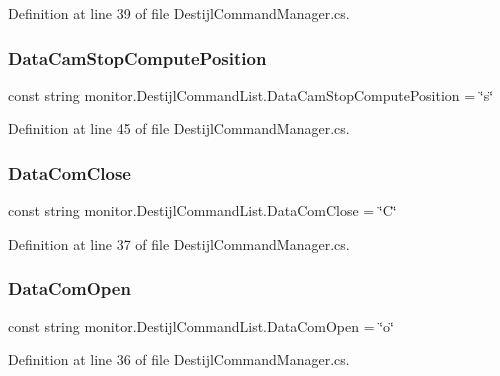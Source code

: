 Definition at line 39 of file Destijl\+Command\+Manager.\+cs.

\mbox{\label{classmonitor_1_1_destijl_command_list_ad09dd921c6c8cf8c7d90a2c0a05d4056}} 
\subsubsection{Data\+Cam\+Stop\+Compute\+Position}
{\footnotesize\ttfamily const string monitor.\+Destijl\+Command\+List.\+Data\+Cam\+Stop\+Compute\+Position = \char`\"{}s\char`\"{}}



Definition at line 45 of file Destijl\+Command\+Manager.\+cs.

\mbox{\label{classmonitor_1_1_destijl_command_list_ad97cbe948c71a4dc3fa95afbf9ca26d8}} 
\subsubsection{Data\+Com\+Close}
{\footnotesize\ttfamily const string monitor.\+Destijl\+Command\+List.\+Data\+Com\+Close = \char`\"{}C\char`\"{}}



Definition at line 37 of file Destijl\+Command\+Manager.\+cs.

\mbox{\label{classmonitor_1_1_destijl_command_list_a1bcde55da429bcf2c04ed6d0621e496f}} 
\subsubsection{Data\+Com\+Open}
{\footnotesize\ttfamily const string monitor.\+Destijl\+Command\+List.\+Data\+Com\+Open = \char`\"{}o\char`\"{}}



Definition at line 36 of file Destijl\+Command\+Manager.\+cs.

